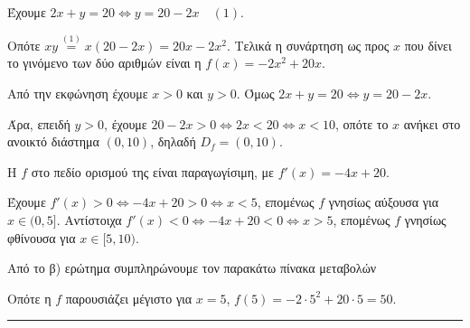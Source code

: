 \begin{alist}
\item 
\begin{rlist}
\item Έχουμε $2x + y = 20 \Leftrightarrow y = 20 - 2x \quad (1)$.

Οπότε $xy \overset{(1)}{=} x(20 - 2x) = 20x - 2x^2$. Τελικά η συνάρτηση ως προς $x$ που δίνει το γινόμενο των δύο αριθμών είναι η $f(x) = -2x^2 + 20x$.

\item Από την εκφώνηση έχουμε $x > 0$ και $y > 0$. Όμως $2x + y = 20 \Leftrightarrow y = 20 - 2x$.

Άρα, επειδή $y > 0$, έχουμε $20 - 2x > 0 \Leftrightarrow 2x < 20 \Leftrightarrow x < 10$, οπότε το $x$ ανήκει στο ανοικτό διάστημα $(0,10)$, δηλαδή $D_f = (0,10)$.
\end{rlist}

\item Η $f$ στο πεδίο ορισμού της είναι παραγωγίσιμη, με $f'(x) = -4x + 20$.

Έχουμε $f'(x) > 0 \Leftrightarrow -4x + 20 > 0 \Leftrightarrow x < 5$, επομένως $f$ γνησίως αύξουσα για $x \in (0,5]$. Αντίστοιχα $f'(x) < 0 \Leftrightarrow -4x + 20 < 0 \Leftrightarrow x > 5$, επομένως $f$ γνησίως φθίνουσα για $x \in [5,10)$.

\item Από το β) ερώτημα συμπληρώνουμε τον παρακάτω πίνακα μεταβολών

\begin{center}
\end{center}

Οπότε η $f$ παρουσιάζει μέγιστο για $x=5$, $f(5) = -2 \cdot 5^2 + 20 \cdot 5 = 50$.
\end{alist}
\vspace{6mm}
\noindent\rule{\textwidth}{0.4pt}
\vspace{6mm}

